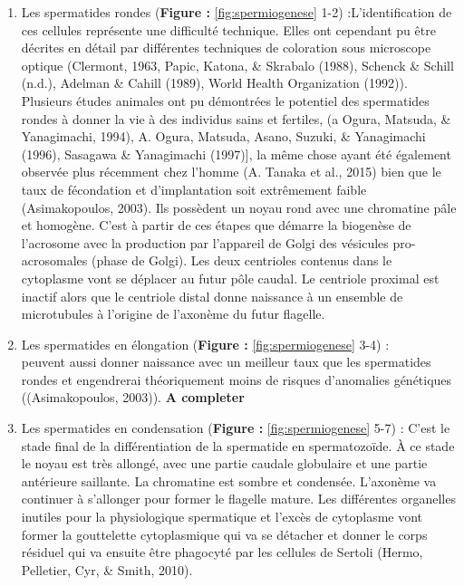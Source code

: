 \documentclass[12pt,twoside]{reedthesis}
\providecommand{\tightlist}{%
  \setlength{\itemsep}{0pt}\setlength{\parskip}{0pt}}
\theoremstyle{definition}
\theoremstyle{definition}
\theoremstyle{remark}
\begin{document}
  \begin{enumerate}
  \def\labelenumi{\arabic{enumi}.}
  \tightlist
  \item
    Les spermatides rondes (\textbf{Figure : }\ref{fig:spermiogenese} 1-2)
    :L'identification de ces cellules représente une difficulté technique.
    Elles ont cependant pu être décrites en détail par différentes
    techniques de coloration sous microscope optique (Clermont, 1963,
    Papic, Katona, \& Skrabalo (1988), Schenck \& Schill (n.d.), Adelman
    \& Cahill (1989), World Health Organization (1992)). Plusieurs études
    animales ont pu démontrées le potentiel des spermatides rondes à
    donner la vie à des individus sains et fertiles, (a Ogura, Matsuda, \&
    Yanagimachi, 1994), A. Ogura, Matsuda, Asano, Suzuki, \& Yanagimachi
    (1996), Sasagawa \& Yanagimachi (1997){]}, la même chose ayant été
    également observée plus récemment chez l'homme (A. Tanaka et al.,
    2015) bien que le taux de fécondation et d'implantation soit
    extrêmement faible (Asimakopoulos, 2003). Ils possèdent un noyau rond
    avec une chromatine pâle et homogène. C'est à partir de ces étapes que
    démarre la biogenèse de l'acrosome avec la production par l'appareil
    de Golgi des vésicules pro-acrosomales (phase de Golgi). Les deux
    centrioles contenus dans le cytoplasme vont se déplacer au futur pôle
    caudal. Le centriole proximal est inactif alors que le centriole
    distal donne naissance à un ensemble de microtubules à l'origine de
    l'axonème du futur flagelle.\\
  \item
    Les spermatides en élongation (\textbf{Figure :
    }\ref{fig:spermiogenese} 3-4) :\\
    peuvent aussi donner naissance avec un meilleur taux que les
    spermatides rondes et engendrerai théoriquement moins de risques
    d'anomalies génétiques ((Asimakopoulos, 2003)). \textbf{A completer}\\
  \item
    Les spermatides en condensation (\textbf{Figure :
    }\ref{fig:spermiogenese} 5-7) : C'est le stade final de la
    différentiation de la spermatide en spermatozoïde. À ce stade le noyau
    est très allongé, avec une partie caudale globulaire et une partie
    antérieure saillante. La chromatine est sombre et condensée. L'axonème
    va continuer à s'allonger pour former le flagelle mature. Les
    différentes organelles inutiles pour la physiologique spermatique et
    l'excès de cytoplasme vont former la gouttelette cytoplasmique qui va
    se détacher et donner le corps résiduel qui va ensuite être phagocyté
    par les cellules de Sertoli (Hermo, Pelletier, Cyr, \& Smith, 2010).
  \end{enumerate}
  
\end{document}
